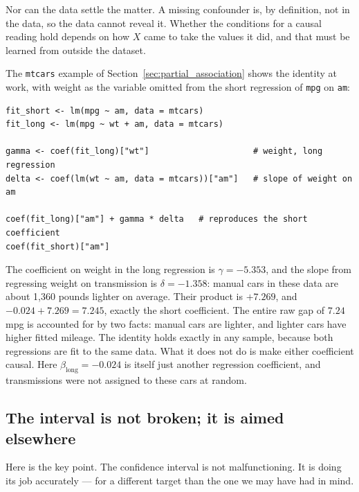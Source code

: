 \documentclass[11pt]{report}
\begin{document}
Nor can the data settle the matter. A missing confounder is, by definition, not in the data, so the data cannot reveal it. Whether the conditions for a causal reading hold depends on how \(X\) came to take the values it did, and that must be learned from outside the dataset.

The \texttt{mtcars} example of Section~\ref{sec:partial_association} shows the identity at work, with weight as the variable omitted from the short regression of \texttt{mpg} on \texttt{am}:

\begin{lstlisting}
fit_short <- lm(mpg ~ am, data = mtcars)
fit_long <- lm(mpg ~ wt + am, data = mtcars)

gamma <- coef(fit_long)["wt"]                     # weight, long regression
delta <- coef(lm(wt ~ am, data = mtcars))["am"]   # slope of weight on am

coef(fit_long)["am"] + gamma * delta   # reproduces the short coefficient
coef(fit_short)["am"]
\end{lstlisting}

The coefficient on weight in the long regression is \(\gamma=-5.353\), and the slope from regressing weight on transmission is \(\delta=-1.358\): manual cars in these data are about 1{,}360 pounds lighter on average. Their product is \(+7.269\), and \(-0.024+7.269=7.245\), exactly the short coefficient. The entire raw gap of \(7.24\) mpg is accounted for by two facts: manual cars are lighter, and lighter cars have higher fitted mileage. The identity holds exactly in any sample, because both regressions are fit to the same data. What it does not do is make either coefficient causal. Here \(\beta_{\text{long}}=-0.024\) is itself just another regression coefficient, and transmissions were not assigned to these cars at random.

\subsection{The interval is not broken; it is aimed elsewhere}

Here is the key point. The confidence interval is not malfunctioning. It is doing its job accurately --- for a different target than the one we may have had in mind.
\end{document}
